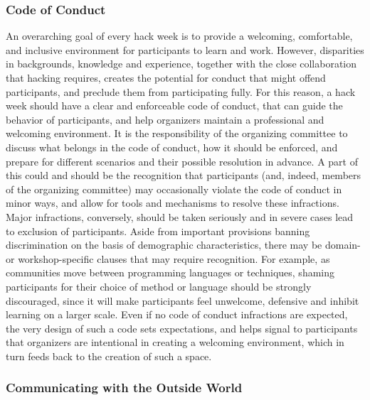 \documentclass{aastex62}
\begin{document}
\clearpage
\subsubsection{Code of Conduct}

An overarching goal of every hack week is to provide a welcoming, comfortable, and inclusive environment for participants to learn and work.
However, disparities in backgrounds, knowledge and experience, together with the close collaboration that hacking requires, creates the potential for conduct that might offend participants, and preclude them from participating fully.
For this reason, a hack week should have a clear and enforceable code of conduct, that can guide the behavior of participants, and help organizers maintain a professional and welcoming environment.
It is the responsibility of the organizing committee to discuss what belongs in the code of conduct, how it should be enforced, and prepare for different scenarios and their possible resolution in advance.
A part of this could and should be the recognition that participants (and, indeed, members of the organizing committee) may occasionally violate the code of conduct in minor ways, and allow for tools and mechanisms to resolve these infractions. Major infractions, conversely, should be taken seriously and in severe cases lead to exclusion of participants.
Aside from important provisions banning discrimination on the basis of demographic characteristics, there may be domain- or workshop-specific clauses that may require recognition. For example, as communities move between programming languages or techniques, shaming participants for their choice of method or language should be strongly discouraged, since it will make participants feel unwelcome, defensive and inhibit learning on a larger scale.
Even if no code of conduct infractions are expected, the very design of such a code sets expectations, and helps signal to participants that organizers are intentional in creating a welcoming environment, which in turn feeds back to the creation of such a space.

\subsubsection{Communicating with the Outside World}
\end{document}
